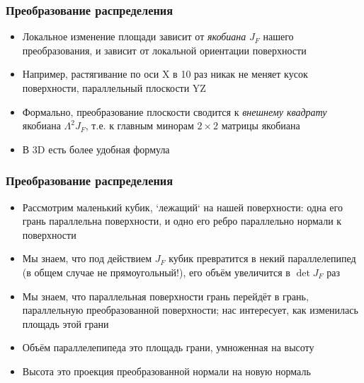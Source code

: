 \documentclass[handout,10pt]{beamer}
\begin{document}
\begin{frame}
\frametitle{Преобразование распределения}
\begin{itemize}
\item Локальное изменение площади зависит от \textit{якобиана} \begin{math}J_F\end{math} нашего преобразования, и зависит от локальной ориентации поверхности
\pause
\item Например, растягивание по оси X в 10 раз никак не меняет кусок поверхности, параллельный плоскости YZ
\pause
\item Формально, преобразование плоскости сводится к \textit{внешнему квадрату} якобиана \begin{math}\Lambda^2 J_F\end{math}, т.е. к главным минорам \begin{math}2\times 2\end{math} матрицы якобиана
\pause
\item В 3D есть более удобная формула
\end{itemize}
\end{frame}

\begin{frame}
\frametitle{Преобразование распределения}
\begin{itemize}
\item Рассмотрим маленький кубик, `лежащий` на нашей поверхности: одна его грань параллельна поверхности, и одно его ребро параллельно нормали к поверхности
\pause
\item Мы знаем, что под действием \begin{math}J_F\end{math} кубик превратится в некий параллелепипед (в общем случае не прямоугольный!), его объём увеличится в \begin{math}\det J_F\end{math} раз
\pause
\item Мы знаем, что параллельная поверхности грань перейдёт в грань, параллельную преобразованной поверхности; нас интересует, как изменилась площадь этой грани
\pause
\item Объём параллелепипеда это площадь грани, умноженная на высоту
\pause
\item Высота это проекция преобразованной нормали на новую нормаль
\end{itemize}
\end{frame}
\end{document}
